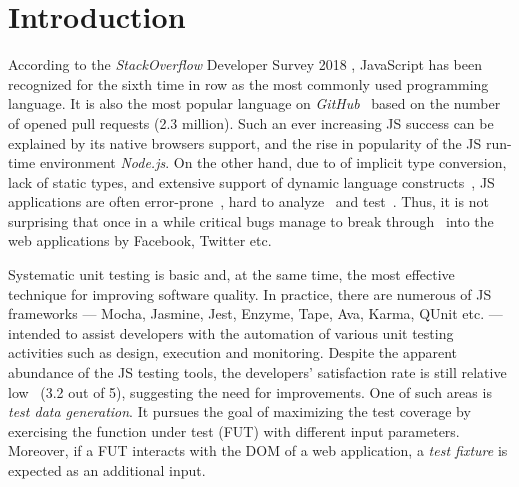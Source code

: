 \documentclass[sigconf,review]{acmart}
\begin{document}



\maketitle

\section{Introduction}
\label{sec.intro}

According to the \emph{StackOverflow} Developer Survey 2018 \cite{stackoverflow2018}, JavaScript has been recognized for the sixth time in row as the most commonly used programming language. It is also the most popular language on \emph{GitHub}~\cite{guthub2017} based on the number of opened pull requests (2.3 million). Such an ever increasing JS success can be explained by its native browsers support, and the rise in popularity of the JS run-time environment \emph{Node.js}. On the other hand, due to of implicit type conversion, lack of static types, and extensive support of dynamic language constructs~\cite{richards2010analysis}, JS applications are often error-prone~\cite{frolin:TSE16}, hard to analyze~\cite{andreasen2017survey, sun2017analysis} and test~\cite{mesbah2015advances}. Thus, it is not surprising that once in a while critical bugs manage to break through~\cite{bugstories2017} into the web applications by Facebook, Twitter etc.

Systematic unit testing is basic and, at the same time, the most effective technique for improving software quality. In practice, there are numerous of JS frameworks --- Mocha, Jasmine, Jest, Enzyme, Tape, Ava, Karma, QUnit etc. --- intended to assist developers with the automation of various unit testing activities such as design, execution and monitoring. Despite the apparent abundance of the JS testing tools, the developers' satisfaction rate is still relative low~\cite{stateJS2017} (3.2 out of 5), suggesting the need for improvements. One of such areas is \emph{test data generation}. It pursues the goal of maximizing the test coverage by exercising the function under test (FUT) with different input parameters. Moreover, if a FUT interacts with the DOM of a web application, a \emph{test fixture} is expected as an additional input. 
\end{document}
